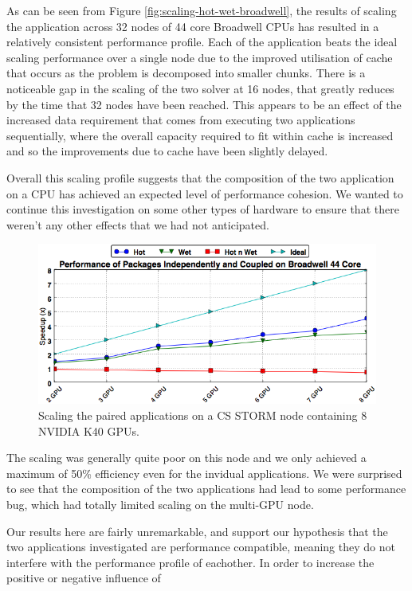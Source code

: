 \documentclass[runningheads,a4paper]{llncs}
\begin{document}
As can be seen from Figure \ref{fig:scaling-hot-wet-broadwell}, the results of scaling the application across 32 nodes of 44 core Broadwell CPUs has resulted in a relatively consistent performance profile. Each of the application beats the ideal scaling performance over a single node due to the improved utilisation of cache that occurs as the problem is decomposed into smaller chunks. There is a noticeable gap in the scaling of the two solver at 16 nodes, that greatly reduces by the time that 32 nodes have been reached. This appears to be an effect of the increased data requirement that comes from executing two applications sequentially, where the overall capacity required to fit within cache is increased and so the improvements due to cache have been slightly delayed.

Overall this scaling profile suggests that the composition of the two application on a CPU has achieved an expected level of performance cohesion. We wanted to continue this investigation on some other types of hardware to ensure that there weren't any other effects that we had not anticipated.

\begin{figure}
\centering
\includegraphics[width=1.0\linewidth]{gpu_storm}
\caption{Scaling the paired applications on a CS STORM node containing 8 NVIDIA K40 GPUs.}
\label{fig:scaling-hot-wet-storm}
\end{figure}

The scaling was generally quite poor on this node and we only achieved a maximum of 50\% efficiency even for the invidual applications. We were surprised to see that the composition of the two applications had lead to some performance bug, which had totally limited scaling on the multi-GPU node.


Our results here are fairly unremarkable, and support our hypothesis that the two applications investigated are performance compatible, meaning they do not interfere with the performance profile of eachother. In order to increase the positive or negative influence of 
\end{document}
